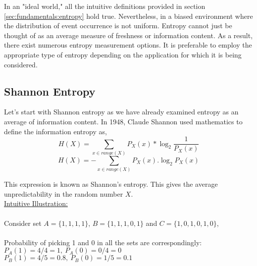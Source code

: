 In an "ideal world," all the intuitive definitions provided in section \ref{sec:fundamentals:entropy} hold true. Nevertheless, in a biased environment where the distribution of event occurrence is not uniform. Entropy cannot just be thought of as an average measure of freshness or information content. As a result, there exist numerous entropy measurement options. It is preferable to employ the appropriate type of entropy depending on the application for which it is being considered.

%
%
\subsection{Shannon Entropy}
\label{subsec:fundamentals:types:shannon}

Let's start with Shannon entropy as we have already examined entropy as an average of information content. In 1948, Claude Shannon used mathematics to define the information entropy as,
\begin{equation*}
H(X) = \sum_{x \in range(X)} P_{X}(x)*\log_{2}\frac{1}{P_{X}(x)} 
\end{equation*}
\begin{equation}\label{eq:2:2}
H(X) = {-}\sum_{x \in range(X)} P_{X}(x).\log_{2}P_{X}(x) 
\end{equation}

This expression is known as Shannon’s entropy. This gives the average unpredictability in the random number $X$.\\

\underline{Intuitive Illustration:}\\\\
Consider set $A = \{1,1,1,1\}$, $B = \{1,1,1,0,1\}$ and $C = \{1,0,1,0,1,0\}$,\\\\
Probability of picking 1 and 0 in all the sets are correspondingly:\\

$P_{A}(1) = 4/4 = 1,\ P_{A}(0) = 0/4 = 0$\\
 
$P_{B}(1) = 4/5 = 0.8,\ P_{B}(0) = 1/5 = 0.1$\\

